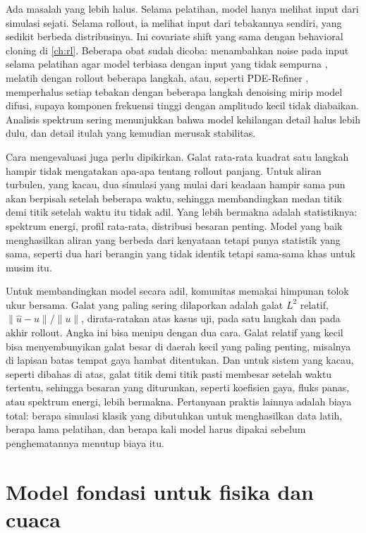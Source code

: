 Ada masalah yang lebih halus. Selama pelatihan, model hanya melihat input dari simulasi sejati. Selama
rollout, ia melihat input dari tebakannya sendiri, yang sedikit berbeda distribusinya. Ini covariate
shift yang sama dengan behavioral cloning di \cref{ch:rl}. Beberapa obat sudah dicoba: menambahkan noise
pada input selama pelatihan agar model terbiasa dengan input yang tidak sempurna \citep{sanchez2020},
melatih dengan rollout beberapa langkah, atau, seperti PDE-Refiner \citep{lippe2023}, memperhalus
setiap tebakan dengan beberapa langkah denoising mirip model difusi, supaya komponen frekuensi tinggi
dengan amplitudo kecil tidak diabaikan. Analisis spektrum sering menunjukkan bahwa model kehilangan
detail halus lebih dulu, dan detail itulah yang kemudian merusak stabilitas.

Cara mengevaluasi juga perlu dipikirkan. Galat rata-rata kuadrat satu langkah hampir tidak mengatakan apa-apa tentang
rollout panjang. Untuk aliran turbulen, yang kacau, dua simulasi yang mulai dari keadaan hampir sama pun akan
berpisah setelah beberapa waktu, sehingga membandingkan medan titik demi titik setelah waktu itu tidak adil.
Yang lebih bermakna adalah statistiknya: spektrum energi, profil rata-rata, distribusi besaran penting. Model yang
baik menghasilkan aliran yang berbeda dari kenyataan tetapi punya statistik yang sama, seperti dua hari berangin
yang tidak identik tetapi sama-sama khas untuk musim itu.

Untuk membandingkan model secara adil, komunitas memakai himpunan tolok ukur bersama. Galat yang paling sering dilaporkan
adalah galat $L^2$ relatif, $\|\hat u-u\|/\|u\|$, dirata-ratakan atas kasus uji, pada satu langkah dan pada akhir rollout.
Angka ini bisa menipu dengan dua cara. Galat relatif yang kecil bisa menyembunyikan galat besar di daerah kecil yang paling
penting, misalnya di lapisan batas tempat gaya hambat ditentukan. Dan untuk sistem yang kacau, seperti dibahas di atas,
galat titik demi titik pasti membesar setelah waktu tertentu, sehingga besaran yang diturunkan, seperti koefisien gaya,
fluks panas, atau spektrum energi, lebih bermakna. Pertanyaan praktis lainnya adalah biaya total: berapa simulasi klasik yang
dibutuhkan untuk menghasilkan data latih, berapa lama pelatihan, dan berapa kali model harus dipakai sebelum
penghematannya menutup biaya itu.

\section{Model fondasi untuk fisika dan cuaca}

